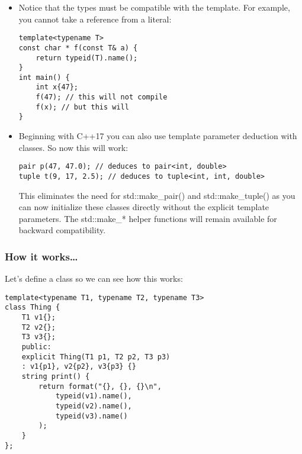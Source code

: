 \begin{itemize}
\begin{lstlisting}[style=styleCXX]
int main() {
	cout << format("T1 T2: {}\n", f(47, 47L));
	cout << format("T1 T2: {}\n", f(47L, 47.0));
	cout << format("T1 T2: {}\n", f(47.0, "47"));
}
\end{lstlisting}

Output:

\begin{tcblisting}{commandshell={}}
T1 T2: int long
T1 T2: long double
T1 T2: double char const *
\end{tcblisting}

Here the compiler is deducing types for both T1 and T2.

\item 
Notice that the types must be compatible with the template. For example, you cannot take a reference from a literal:

\begin{lstlisting}[style=styleCXX]
template<typename T>
const char * f(const T& a) {
	return typeid(T).name();
}
int main() {
	int x{47};
	f(47); // this will not compile
	f(x); // but this will
}
\end{lstlisting}

\item 
Beginning with C++17 you can also use template parameter deduction with classes. So now this will work:

\begin{lstlisting}[style=styleCXX]
pair p(47, 47.0); // deduces to pair<int, double>
tuple t(9, 17, 2.5); // deduces to tuple<int, int, double>
\end{lstlisting}

This eliminates the need for std::make\_pair() and std::make\_tuple() as you can now initialize these classes directly without the explicit template parameters. The std::make\_* helper functions will remain available for backward compatibility.
\end{itemize}

\subsubsection{How it works…}

Let's define a class so we can see how this works:

\begin{lstlisting}[style=styleCXX]
template<typename T1, typename T2, typename T3>
class Thing {
	T1 v1{};
	T2 v2{};
	T3 v3{};
	public:
	explicit Thing(T1 p1, T2 p2, T3 p3)
	: v1{p1}, v2{p2}, v3{p3} {}
	string print() {
		return format("{}, {}, {}\n",
			typeid(v1).name(),
			typeid(v2).name(),
			typeid(v3).name()
		);
	}
};
\end{lstlisting}

